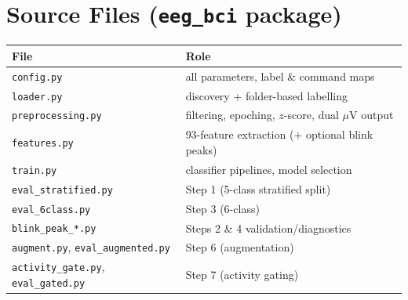 \documentclass[11pt,a4paper]{article}
\newcommand{\muv}{$\mu$V}
\newcommand{\code}[1]{\texttt{#1}}
\begin{document}
\section{Source Files (\code{eeg\_bci} package)}
\begin{center}\small
\begin{tabular}{@{}ll@{}}
\toprule
File & Role \\\midrule
\code{config.py}          & all parameters, label \& command maps \\
\code{loader.py}          & discovery + folder-based labelling \\
\code{preprocessing.py}   & filtering, epoching, $z$-score, dual \muv{} output \\
\code{features.py}        & 93-feature extraction ($+$ optional blink peaks) \\
\code{train.py}           & classifier pipelines, model selection \\
\code{eval\_stratified.py}& Step 1 (5-class stratified split) \\
\code{eval\_6class.py}    & Step 3 (6-class) \\
\code{blink\_peak\_*.py}  & Steps 2 \& 4 validation/diagnostics \\
\code{augment.py}, \code{eval\_augmented.py} & Step 6 (augmentation) \\
\code{activity\_gate.py}, \code{eval\_gated.py} & Step 7 (activity gating) \\
\bottomrule
\end{tabular}
\end{center}
\end{document}
